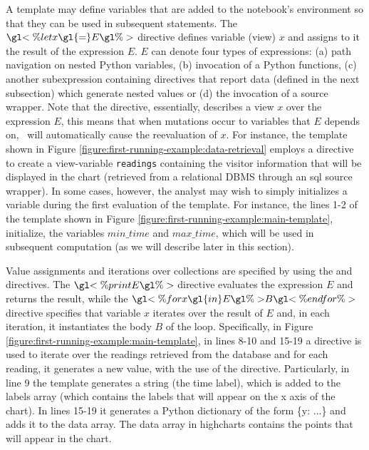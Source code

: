  A template may define variables that are added to the notebook's environment so that they can be used in subsequent statements.  The $\gl{<\% let } x \gl{ = } E \gl{ \%>}$ directive defines variable (view) $x$ and assigns to it the result of the expression $E$. $E$ can denote four types of expressions: (a) path navigation on nested Python variables, (b) invocation of a Python functions, (c) another subexpression containing directives that report data (defined in the next subsection) which generate nested values or (d) the invocation of a source wrapper.  Note that the  directive, essentially, describes a view $x$ over the expression $E$, this means that when mutations occur to variables that $E$ depends on, \projname\ will automatically cause the reevaluation of $x$.  For instance, the template shown in Figure \ref{figure:first-running-example:data-retrieval} employs a  directive to create a view-variable \texttt{readings} containing the visitor information that will be displayed in the chart (retrieved from a relational DBMS through an sql source wrapper). In some cases, however, the analyst may wish to simply initializes a variable during the first evaluation of the template. For instance, the lines 1-2 of the template shown in Figure \ref{figure:first-running-example:main-template}, initialize, the variables $min\_time$ and $max\_time$, which will be used in subsequent computation (as we will describe later in this section).


 Value assignments and iterations over collections are specified by using the  and  directives. The $\gl{<\%print } E \gl{\%>}$ directive evaluates the expression $E$ and returns the result, while the $\gl{<\%for } x \gl{ in } E \gl{\%> } B \gl{ <\%end for\%>}$ directive specifies that variable $x$ iterates over the result of $E$ and, in each iteration, it instantiates the body $B$ of the  loop. Specifically, in Figure \ref{figure:first-running-example:main-template}, in lines 8-10 and 15-19 a  directive is used to iterate over the readings retrieved from the database and for each reading, it generates a new value, with the use of the  directive. Particularly, in line 9 the template generates a string (the time label), which is added to the labels array (which contains the labels that will appear on the x axis of the chart). In lines 15-19 it generates a Python dictionary of the form \{y: ...\} and adds it to the data array. The data array in highcharts contains the points that will appear in the chart. 


